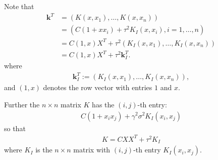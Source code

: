 \documentclass{scrartcl}
\begin{document}
Note that
\begin{align*}
  \mathbf{k}^T &= (K(x, x_1), \dots, K(x, x_n)) \\
  &= \left(C(1 + x x_i) + \tau^2 K_I(x, x_i), i = 1, \dots, n \right)
  \\
               &= C (1, x) X^T + \tau^2 (K_I(x, x_1), \dots, K_I(x, x_n)) \\
  &= C (1, x) X^T + \tau^2 \mathbf{k}_I^T. 
\end{align*}
where
\begin{align*}
  \mathbf{k}_I^T := (K_I(x, x_1), \dots, K_I(x, x_n)),
\end{align*}
and $(1, x)$ denotes the row vector with entries $1$ and $x$. 

Further the $n \times n$ matrix $K$ has the $(i, j)$-th entry:
\begin{align*}
  C(1 + x_i x_j) + \gamma^2 \sigma^2 K_I(x_i, x_j)
\end{align*}
so that
\begin{align}\label{K_exp}
  K = C X X^T + \tau^2 K_I
\end{align}
where $K_I$ is the $n \times n$ matrix with $(i, j)$-th entry
$K_I(x_i, x_j)$. 
\end{document}
